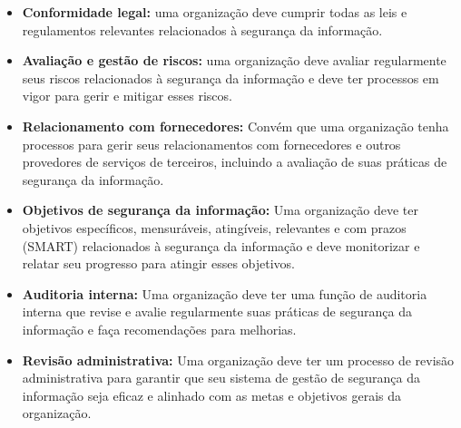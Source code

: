 \begin{itemize}
  \item \textbf{Conformidade legal: }uma organização deve cumprir todas as leis e regulamentos relevantes relacionados à segurança da informação.
  \item \textbf{Avaliação e gestão de riscos: }uma organização deve avaliar regularmente seus riscos relacionados à segurança da informação e deve ter processos em vigor para gerir e mitigar esses riscos.
  \item \textbf{Relacionamento com fornecedores: }Convém que uma organização tenha processos para gerir seus relacionamentos com fornecedores e outros provedores de serviços de terceiros, incluindo a avaliação de suas práticas de segurança da informação.
  \item \textbf{Objetivos de segurança da informação: }Uma organização deve ter objetivos específicos, mensuráveis, atingíveis, relevantes e com prazos (SMART) relacionados à segurança da informação e deve monitorizar e relatar seu progresso para atingir esses objetivos.
  \item \textbf{Auditoria interna: }Uma organização deve ter uma função de auditoria interna que revise e avalie regularmente suas práticas de segurança da informação e faça recomendações para melhorias.
  \item \textbf{Revisão administrativa: }Uma organização deve ter um processo de revisão administrativa para garantir que seu sistema de gestão de segurança da informação seja eficaz e alinhado com as metas e objetivos gerais da organização.
\end{itemize}

\newpage
